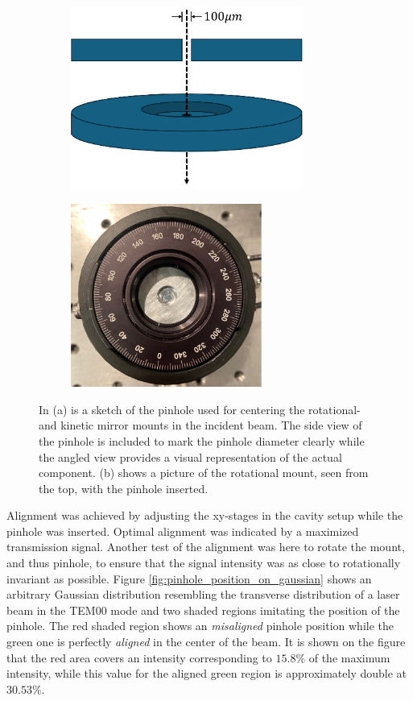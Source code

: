 \begin{figure}[h!]
    \centering
    \begin{subfigure}[b]{0.49\textwidth}
        \centering
        \includegraphics[height=6cm]{figures/pinhole_sketch.pdf}
        \caption{}
        \label{fig:pinhole_sketch}
    \end{subfigure}
    \hfill
    \begin{subfigure}[b]{0.49\textwidth}
        \centering
        \includegraphics[height=6cm]{figures/pinhole_picture.pdf}
        \caption{}
        \label{fig:pinhole_picture}
    \end{subfigure}
    \caption{In (a) is a sketch of the pinhole used for centering the rotational- and kinetic mirror mounts in the incident beam. The side view of the pinhole is included to mark the pinhole diameter clearly while the angled view provides a visual representation of the actual component. (b) shows a picture of the rotational mount, seen from the top, with the pinhole inserted.}
    \label{fig:pinhole_sketch_and_picture}
\end{figure}

Alignment was achieved by adjusting the xy-stages in the cavity setup while the pinhole was inserted. Optimal alignment was indicated by a maximized transmission signal. Another test of the alignment was here to rotate the mount, and thus pinhole, to ensure that the signal intensity was as close to rotationally invariant as possible. Figure \ref{fig:pinhole_position_on_gaussian} shows an arbitrary Gaussian distribution resembling the transverse distribution of a laser beam in the TEM00 mode and two shaded regions imitating the position of the pinhole. The red shaded region shows an \emph{misaligned} pinhole position while the green one is perfectly \emph{aligned} in the center of the beam. It is shown on the figure that the red area covers an intensity corresponding to $15.8\%$ of the maximum intensity, while this value for the aligned green region is approximately double at $30.53\%$.

